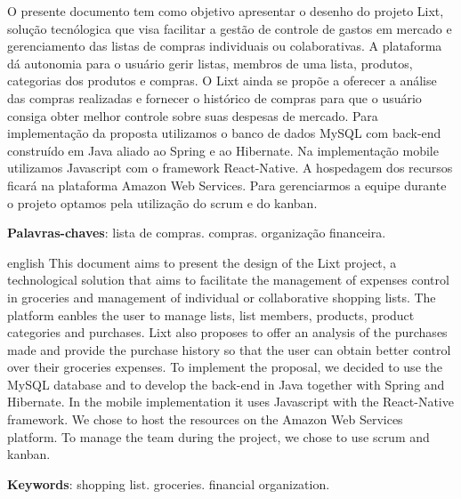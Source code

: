 
\setlength{\absparsep}{18pt} %
\begin{resumo}

O presente documento tem como objetivo apresentar o desenho do projeto Lixt, solução tecnólogica
que visa facilitar a gestão de controle de gastos em mercado e gerenciamento das listas de compras individuais ou colaborativas. 
A plataforma dá autonomia para o usuário gerir listas, membros de uma lista, produtos, categorias dos produtos e compras. O Lixt ainda se propõe a oferecer a análise das compras realizadas e fornecer o histórico de compras para que o usuário consiga obter melhor controle sobre suas despesas de mercado. 
Para implementação da proposta utilizamos o banco de dados MySQL com back-end construído em Java aliado ao Spring e ao Hibernate. Na implementação mobile utilizamos Javascript com o framework React-Native. A hospedagem dos recursos
ficará na plataforma Amazon Web Services. Para gerenciarmos a equipe durante o projeto optamos pela utilização do scrum e do kanban. 

 \textbf{Palavras-chaves}: lista de compras. compras. organização financeira.
\end{resumo}

\begin{resumo}[Abstract]
 \begin{otherlanguage*}{english}
This document aims to present the design of the Lixt project, a technological solution that aims to facilitate the management of expenses control in groceries and management of individual or collaborative shopping lists.
The platform eanbles the user to manage lists, list members, products, product categories and purchases. Lixt also proposes to offer an analysis of the purchases made and provide the purchase history so that the user can obtain better control over their groceries expenses.
To implement the proposal, we decided to use the MySQL database and to develop the back-end in Java together with Spring and Hibernate. In the mobile implementation it uses Javascript with the React-Native framework. We chose to host the resources on the Amazon Web Services platform. To manage the team during the project, we chose to use scrum and kanban.
   \vspace{\onelineskip}

   \noindent 
   \textbf{Keywords}: shopping list. groceries. financial organization.
 \end{otherlanguage*}
\end{resumo}